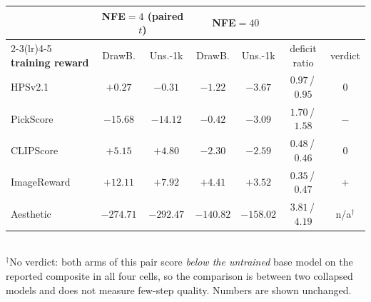 \begin{center}
\begin{tabular}{lcccccc}
\toprule
& \multicolumn{2}{c}{NFE$=4$ (paired $t$)} & \multicolumn{2}{c}{NFE$=40$} & &\\
\cmidrule(lr){2-3}\cmidrule(lr){4-5}
\textbf{training reward} & DrawB. & Uns.-1k & DrawB. & Uns.-1k & deficit ratio & verdict\\
\midrule
HPSv2.1 & $+0.27$ & $-0.31$ & $-1.22$ & $-3.67$ & $0.97$\,/\,$0.95$ & $0$\\
PickScore & $-15.68$ & $-14.12$ & $-0.42$ & $-3.09$ & $1.70$\,/\,$1.58$ & $-$\\
CLIPScore & $+5.15$ & $+4.80$ & $-2.30$ & $-2.59$ & $0.48$\,/\,$0.46$ & $0$\\
ImageReward & $+12.11$ & $+7.92$ & $+4.41$ & $+3.52$ & $0.35$\,/\,$0.47$ & +\\
Aesthetic & $-274.71$ & $-292.47$ & $-140.82$ & $-158.02$ & $3.81$\,/\,$4.19$ & n/a$^{\dagger}$\\
\bottomrule
\end{tabular}
\\[2pt]{\footnotesize $^{\dagger}$No verdict: both arms of this pair score \emph{below the untrained}
base model on the reported composite in all four cells, so the comparison is between two
collapsed models and does not measure few-step quality. Numbers are shown unchanged.}
\end{center}

